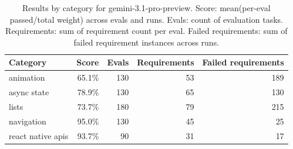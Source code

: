 \begin{table}[htbp]
\centering
\begin{tabular}{lrrrr}
\toprule
Category & Score & Evals & Requirements & Failed requirements \\
\midrule
animation & 65.1\% & 130 & 53 & 189 \\
async state & 78.9\% & 130 & 65 & 130 \\
lists & 73.7\% & 180 & 79 & 215 \\
navigation & 95.0\% & 130 & 45 & 25 \\
react native apis & 93.7\% & 90 & 31 & 17 \\
\bottomrule
\end{tabular}
\caption{Results by category for gemini-3.1-pro-preview. Score: mean(per-eval passed/total weight) across evals and runs. Evals: count of evaluation tasks. Requirements: sum of requirement count per eval. Failed requirements: sum of failed requirement instances across runs.}
\end{table}
